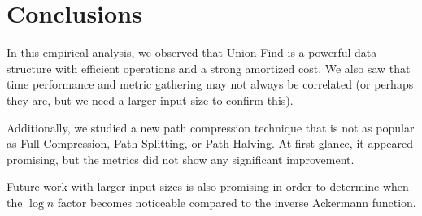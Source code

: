 \section{Conclusions}
In this empirical analysis, we observed that Union-Find is a powerful data structure with efficient operations and a strong amortized cost. We also saw that time performance and metric gathering may not always be correlated (or perhaps they are, but we need a larger input size to confirm this).  

Additionally, we studied a new path compression technique that is not as popular as Full Compression, Path Splitting, or Path Halving. At first glance, it appeared promising, but the metrics did not show any significant improvement.  

Future work with larger input sizes is also promising in order to determine when the \( \log n \) factor becomes noticeable compared to the inverse Ackermann function.
